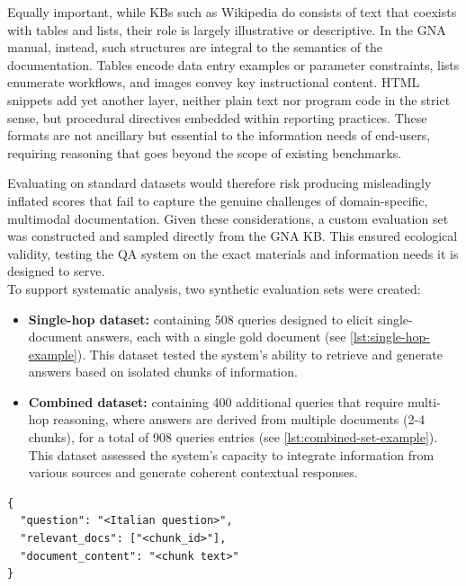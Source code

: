 \begin{spacing}{1.5}
Equally important, while KBs such as Wikipedia do consists of text that coexists with tables and lists, their role is largely illustrative or descriptive. In the GNA manual, instead, such structures are integral to the semantics of the documentation. Tables encode data entry examples or parameter constraints, lists enumerate workflows, and images convey key instructional content. HTML snippets add yet another layer, neither plain text nor program code in the strict sense, but procedural directives embedded within reporting practices. These formats are not ancillary but essential to the information needs of end-users, requiring reasoning that goes beyond the scope of existing benchmarks.

Evaluating on standard datasets would therefore risk producing misleadingly inflated scores that fail to capture the genuine challenges of domain-specific, multimodal documentation. Given these considerations, a custom evaluation set was constructed and sampled directly from the GNA KB. This ensured ecological validity, testing the QA system on the exact materials and information needs it is designed to serve.\\

\noindent To support systematic analysis, two synthetic evaluation sets were created:
\begin{itemize}
      \item \textbf{Single-hop dataset:} containing 508 queries designed to elicit single-document answers, each with a single gold document (see \autoref{lst:single-hop-example}). This dataset tested the system's ability to retrieve and generate answers based on isolated chunks of information.
      \item \textbf{Combined dataset:} containing 400 additional queries that require multi-hop reasoning, where answers are derived from multiple documents (2-4 chunks), for a total of 908 queries entries (see \autoref{lst:combined-set-example}). This dataset assessed the system's capacity to integrate information from various sources and generate coherent contextual responses.
\end{itemize}


\begin{lstlisting}[frame=none,
                   caption={JSON output format for single-hop dataset items.},
                   captionpos=b,
                   label={lst:single-hop-example},
  xleftmargin=0.2\textwidth,
  xrightmargin=0.2\textwidth]
{
  "question": "<Italian question>",
  "relevant_docs": ["<chunk_id>"],
  "document_content": "<chunk text>"
}
\end{lstlisting}


\end{spacing}
